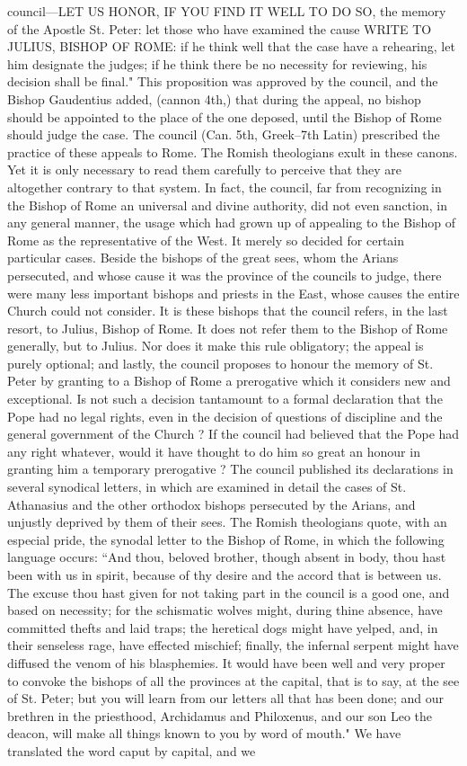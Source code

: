 council—LET US HONOR, IF YOU FIND IT WELL TO DO SO, the memory of the Apostle St. Peter: let those who have examined the cause WRITE TO JULIUS, BISHOP OF ROME: if he think well that the case have a rehearing, let him designate the judges; if he think there be no necessity for reviewing, his decision shall be final." This proposition was approved by the council, and the Bishop Gaudentius added, (cannon 4th,) that during the appeal, no bishop should be appointed to the place of the one deposed, until the Bishop of Rome should judge the case. The council (Can. 5th, Greek--7th Latin) prescribed the practice of these appeals to Rome. The Romish theologians exult in these canons. Yet it is only necessary to read them carefully to perceive that they are altogether contrary to that system. In fact, the council, far from recognizing in the Bishop of Rome an universal and divine authority, did not even sanction, in any general manner, the usage which had grown up of appealing to the Bishop of Rome as the representative of the West. It merely so decided for certain particular cases. Beside the bishops of the great sees, whom the Arians persecuted, and whose cause it was the province of the councils to judge, there were many less important bishops and priests in the East, whose causes the entire Church could not consider. It is these bishops that the council refers, in the last resort, to Julius, Bishop of Rome. It does not refer them to the Bishop of Rome generally, but to Julius. Nor does it make this rule obligatory; the appeal is purely optional; and lastly, the council proposes to honour the memory of St. Peter by granting to a Bishop of Rome a prerogative which it considers new and exceptional. Is not such a decision tantamount to a formal declaration that the Pope had no legal rights, even in the decision of questions of discipline and the general government of the Church ? If the council had believed that the Pope had any right whatever, would it have thought to do him so great an honour in granting him a temporary prerogative ? The council published its declarations in several synodical letters, in which are examined in detail the cases of St. Athanasius and the other orthodox bishops persecuted by the Arians, and unjustly deprived by them of their sees. The Romish theologians quote, with an especial pride, the synodal letter to the Bishop of Rome, in which the following language occurs: “And thou, beloved brother, though absent in body, thou hast been with us in spirit, because of thy desire and the accord that is between us. The excuse thou hast given for not taking part in the council is a good one, and based on necessity; for the schismatic wolves might, during thine absence, have committed thefts and laid traps; the heretical dogs might have yelped, and, in their senseless rage, have effected mischief; finally, the infernal serpent might have diffused the venom of his blasphemies. It would have been well and very proper to convoke the bishops of all the provinces at the capital, that is to say, at the see of St. Peter; but you will learn from our letters all that has been done; and our brethren in the priesthood, Archidamus and Philoxenus, and our son Leo the deacon, will make all things known to you by word of mouth." We have translated the word caput by capital, and we 